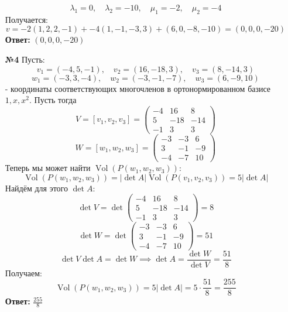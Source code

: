 \documentclass[a4paper]{article}
\newcommand{\mat}[1]{\begin{pmatrix} #1 \end{pmatrix}}
\renewcommand{\f}[2]{\frac{#1}{#2}}
\newcommand{\lr}{\Leftrightarrow}
\newcommand{\Vol}{\operatorname{Vol}}
\begin{document}
\begin{enumerate}
    \[
    \lambda_1 = 0,\quad \lambda_2 = -10,\quad \mu_1 = -2,\quad \mu_2 = -4
    \]
    Получается:
    $$v = -2(1, 2, 2, -1) + -4 (1, -1, -3, 3) + (6, 0, -8, -10) = (0, 0, 0, -20)$$
    \textbf{Ответ: } $(0, 0, 0, -20)$\\


    \item[\textbf{№4}]Пусть:
    $$v_1 = (-4, 5, -1), \quad v_2 = (16, -18, 3), \quad v_3 = (8, -14, 3)$$
    $$w_1 = (-3, 3, -4), \quad w_2 = (-3, -1, -7), \quad w_3 = (6, -9, 10)$$
    - координаты соответствующих многочленов в ортонормированном базисе $1, x, x^2$. Пусть тогда
    $$V = [v_1, v_2, v_3] = \mat{-4 & 16 & 8\\5 &-18 & -14\\-1& 3 & 3}$$
    $$W = [w_1, w_2, w_3] = \mat{-3 & -3 & 6\\ 3 & -1 & -9 \\ -4 & -7 & 10}$$
    Теперь мы может найти $\Vol(P(w_1, w_2, w_3))$:
    $$\Vol(P(w_1, w_2, w_3)) = |\det A| \Vol(P(v_1, v_2, v_3)) = 5|\det A|$$
    Найдём для этого $\det A$:
    $$\det V =  \det \mat{-4 & 16 & 8\\5 &-18 & -14\\-1& 3 & 3} = 8$$
    $$\det W = \det \mat{-3 & -3 & 6\\ 3 & -1 & -9 \\ -4 & -7 & 10} = 51$$
    $$\det V \det A = \det W \implies \det A = \f{\det W}{\det V} = \f{51}{8}$$
    Получаем:
    $$\Vol(P(w_1, w_2, w_3)) = 5|\det A| = 5\cdot \f{51}{8} = \f{255}{8}$$
    \textbf{Ответ: }$\f{255}{8}$\\
    

\end{enumerate}
\end{document}
